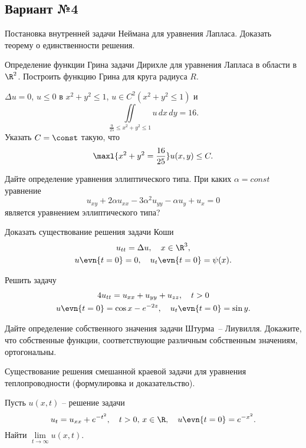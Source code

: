 \documentclass{article}
\begin{document}
\subsection{Вариант №4}

\begin{nums}{-2}
\item \begin{nums}{-2}
\item Постановка внутренней задачи Неймана для уравнения Лапласа.
Доказать теорему о единственности решения.
\item Определение функции Грина задачи Дирихле для уравнения
Лапласа в области в $\R ^2$. Построить функцию Грина для круга
радиуса $R$.
\item $\Delta u = 0$, $u \le 0$ в $x^2 + y^2 \le 1$,
$u \in C^2(x^2 + y^2 \le 1)$ и
$$
\iint\limits_{\frac{9}{25} \le x^2 + y^2 \le 1} u\,dx\,dy
= 16.
$$
Указать $C = \const$ такую, что
$$\maxl{x^2 + y^2 = \frac{16}{25}}u(x, y) \le C.$$
\end{nums}
\item \begin{nums}{-2}
\item Дайте определение уравнения эллиптического типа. При каких $\alpha = const$
уравнение
$$
u_{xy} + 2\alpha u_{xx} - 3\alpha^2u_{yy} - \alpha u_y + u_x = 0
$$
является уравнением эллиптического типа?
\item Доказать существование решения задачи Коши
\begin{gather*}
u_{tt} = \Delta u, \quad x \in \R ^3,\\
u\evn{t = 0} = 0, \quad u_t\evn{t = 0} = \psi(x).
\end{gather*}
\item Решить задачу
\begin{gather*}
4u_{tt} = u_{xx} + u_{yy} + u_{zz}, \quad t > 0\\
u\evn{t = 0} = \cos x - e^{-2z}, \quad u_t\evn{t = 0} = \sin y.
\end{gather*}
\end{nums}
\item
\begin{nums}{-2}
\item Дайте определение собственного значения задачи
Штурма~-- Лиувилля. Докажите, что собственные функции, соответствующие
различным собственным значениям, ортогональны.
\item Существование решения смешанной краевой задачи для уравнения
теплопроводности (формулировка и доказательство).
\item Пусть $u(x, t)$ -- решение задачи
$$
u_t = u_{xx} + e^{-t^2}, \quad t > 0, \, x \in \R , \quad
u\evn{t = 0} = e^{-x^2}.
$$
Найти $\lim\limits_{t \rightarrow \infty}u(x, t)$.
\end{nums}
\end{nums}

\medskip\dmvntrail
\end{document}
